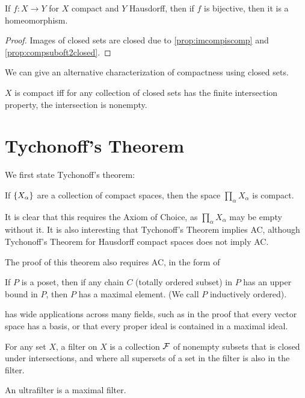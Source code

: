 \begin{proposition}
    If $f\colon X \to Y$ for $X$ compact and $Y$ Hausdorff, then if $f$ is bijective, then it is a homeomorphism.
\end{proposition}

\begin{proof}
    Images of closed sets are closed due to \autoref{prop:imcompiscomp} and \autoref{prop:compsuboft2closed}.
\end{proof}

We can give an alternative characterization of compactness using closed sets.

\begin{proposition}
    $X$ is compact iff for any collection of closed sets has the finite intersection property, the intersection is nonempty.
\end{proposition}

\section{Tychonoff's Theorem}

We first state Tychonoff's theorem:

\begin{theorem}
    \label{thm:tychonoff}
    If $\qty{X_\alpha}$ are a collection of compact spaces, then the space $\prod_\alpha X_\alpha$ is compact.
\end{theorem}

It is clear that this requires the Axiom of Choice, as $\prod_\alpha X_\alpha$ may be empty without it. It is also interesting that Tychonoff's Theorem implies AC, although Tychonoff's Theorem for Hausdorff compact spaces does not imply AC.

The proof of this theorem also requires AC, in the form of 

\begin{theorem}
    \label{thm:zorn}
    If $P$ is a poset, then if any chain $C$ (totally ordered subset) in $P$ has an upper bound in $P$, then $P$ has a maximal element. (We call $P$ inductively ordered).
\end{theorem}

 has wide applications across many fields, such as in the proof that every vector space has a basis, or that every proper ideal is contained in a maximal ideal.

\begin{definition}
    For any set $X$, a filter on $X$ is a collection $\mathcal F$ of nonempty subsets that is closed under intersections, and where all supersets of a set in the filter is also in the filter.

    An ultrafilter is a maximal filter.
\end{definition}

